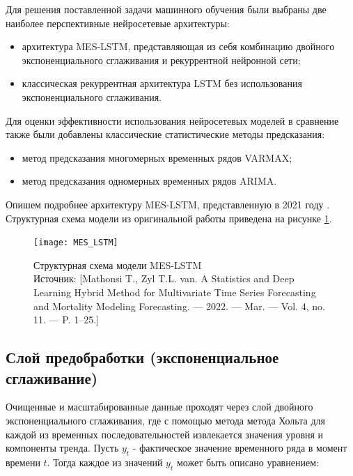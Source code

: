 Для решения поставленной задачи машинного обучения были выбраны две наиболее перспективные нейросетевые архитектуры:

\begin{itemize}
	
	\item архитектура MES-LSTM, представляющая из себя комбинацию двойного экспоненциального сглаживания и рекуррентной нейронной сети;
	
	\item классическая рекуррентная архитектура LSTM без использования экспоненциального сглаживания.
	
\end{itemize} 

Для оценки эффективности использования нейросетевых моделей в сравнение также были добавлены классические статистические методы предсказания:
 
\begin{itemize}

	\item метод предсказания многомерных временных рядов VARMAX;
	
	\item метод предсказания одномерных временных рядов ARIMA.

\end{itemize}    

Опишем подробнее архитектуру MES-LSTM, представленную в 2021 году \cite{MES_RNN}. Структурная схема модели из оригинальной работы приведена на рисунке \ref{fig:MES_LSTM}.

\begin{figure}[h!]
	\centering
	\texttt{[image: MES\_LSTM]}
	\caption{Структурная схема модели MES-LSTM  \\
		Источник: [Mathonsi T., Zyl T.L. van. A Statistics and Deep Learning Hybrid Method for Multivariate Time Series Forecasting and Mortality Modeling  Forecasting. — 2022. — Mar. — Vol. 4, no. 11. — P. 1–25.]}
	\label{fig:MES_LSTM}
	
\end{figure}


\subsection{Слой предобработки (экспоненциальное сглаживание)}
Очищенные и масштабированные данные проходят через слой двойного экспоненциального сглаживания, где с помощью метода метода Хольта для каждой из временных последовательностей извлекается значения уровня и компоненты тренда. Пусть $y_t$ - фактическое значение временного ряда в момент времени $t$. Тогда каждое из значений $y_t$ может быть описано уравнением:

